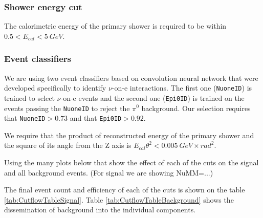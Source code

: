 \subsubsection*{Shower energy cut}

The calorimetric energy of the primary shower is required to be within $0.5<E_{cal}<5\ \unit{GeV}$.

\subsubsection*{Event classifiers}

We are using two event classifiers based on convolution neural network that were developed specifically to identify $\nu$-on-e interactions. The first one (\texttt{NuoneID}) is trained to select $\nu$-on-e events and the second one (\texttt{Epi0ID}) is trained on the events passing the \texttt{NuoneID} to reject the $\pi^0$ background. Our selection requires that \texttt{NuoneID}$>0.73$ and that \texttt{Epi0ID}$>0.92$.

We require that the product of reconstructed energy of the primary shower and the square of its angle from the Z axis is $E_{cal}\theta^2<0.005\ \unit{GeV\times rad^2}$.


Using the many plots below that show the effect of each of the cuts on the signal and all background events. (For signal we are showing NuMM=...)

The final event count and efficiency of each of the cuts is shown on the table \ref{tab:CutflowTableSignal}. Table \ref{tab:CutflowTableBackground} shows the dissemination of background into the individual components.

